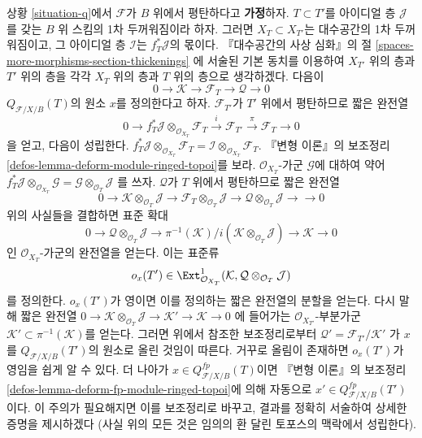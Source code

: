 \begin{remark}[몫의 장애]
\label{remark-q-obs}
상황 \ref{situation-q}에서 $\mathcal{F}$가 $B$ 위에서 평탄하다고
{\bf 가정}하자. $T \subset T'$를 아이디얼 층 $\mathcal{J}$를 갖는
$B$ 위 스킴의 1차 두꺼워짐이라 하자.
그러면 $X_T \subset X_{T'}$는 대수공간의 1차 두꺼워짐이고,
그 아이디얼 층 $\mathcal{I}$는 $f_T^*\mathcal{J}$의 몫이다.
『대수공간의 사상 심화』의 절
\ref{spaces-more-morphisms-section-thickenings}
에 서술된 기본 동치를 이용하여 $X_{T'}$ 위의 층과 $T'$ 위의 층을
각각 $X_T$ 위의 층과 $T$ 위의 층으로 생각하겠다. 다음이
$$
0 \to \mathcal{K} \to \mathcal{F}_T \to \mathcal{Q} \to 0
$$
$Q_{\mathcal{F}/X/B}(T)$의 원소 $x$를 정의한다고 하자.
$\mathcal{F}_{T'}$가 $T'$ 위에서 평탄하므로 짧은 완전열
$$
0 \to f_T^*\mathcal{J} \otimes_{\mathcal{O}_{X_T}} \mathcal{F}_T
\xrightarrow{i} \mathcal{F}_{T'} \xrightarrow{\pi} \mathcal{F}_T \to 0
$$
을 얻고, 다음이 성립한다.
$f_T^*\mathcal{J} \otimes_{\mathcal{O}_{X_T}} \mathcal{F}_T =
\mathcal{I} \otimes_{\mathcal{O}_{X_T}} \mathcal{F}_T$.
『변형 이론』의 보조정리 \ref{defos-lemma-deform-module-ringed-topoi}를 보라.
$\mathcal{O}_{X_T}$-가군 $\mathcal{G}$에 대하여 약어
$
f_T^*\mathcal{J} \otimes_{\mathcal{O}_{X_T}} \mathcal{G} =
\mathcal{G} \otimes_{\mathcal{O}_T} \mathcal{J}
$
를 쓰자. $\mathcal{Q}$가 $T$ 위에서 평탄하므로 짧은 완전열
$$
0 \to
\mathcal{K} \otimes_{\mathcal{O}_T} \mathcal{J} \to
\mathcal{F}_T \otimes_{\mathcal{O}_T} \mathcal{J} \to
\mathcal{Q} \otimes_{\mathcal{O}_T} \mathcal{J} \to
\to 0
$$
위의 사실들을 결합하면 표준 확대
$$
0 \to \mathcal{Q} \otimes_{\mathcal{O}_T} \mathcal{J} \to
\pi^{-1}(\mathcal{K})/i(\mathcal{K} \otimes_{\mathcal{O}_T} \mathcal{J}) \to
\mathcal{K} \to 0
$$
인 $\mathcal{O}_{X_T}$-가군의 완전열을 얻는다. 이는 표준류
$$
o_x(T') \in
\Ext^1_{\mathcal{O}_{X_T}}(\mathcal{K},
\mathcal{Q} \otimes_{\mathcal{O}_T} \mathcal{J})
$$
를 정의한다.
$o_x(T')$가 영이면 이를 정의하는 짧은 완전열의 분할을 얻는다.
다시 말해 짧은 완전열
$0 \to \mathcal{K} \otimes_{\mathcal{O}_T} \mathcal{J} \to
\mathcal{K}' \to \mathcal{K} \to 0$
에 들어가는 $\mathcal{O}_{X_{T'}}$-부분가군
$\mathcal{K}' \subset \pi^{-1}(\mathcal{K})$를 얻는다.
그러면 위에서 참조한 보조정리로부터
$\mathcal{Q}' = \mathcal{F}_{T'}/\mathcal{K}'$
가 $x$를 $Q_{\mathcal{F}/X/B}(T')$의 원소로 올린 것임이 따른다.
거꾸로 올림이 존재하면 $o_x(T')$가 영임을 쉽게 알 수 있다.
더 나아가 $x \in Q_{\mathcal{F}/X/B}^{fp}(T)$이면 『변형 이론』의 보조정리
\ref{defos-lemma-deform-fp-module-ringed-topoi}에 의해 자동으로
$x' \in Q_{\mathcal{F}/X/B}^{fp}(T')$이다. 이 주의가 필요해지면 이를
보조정리로 바꾸고, 결과를 정확히 서술하여 상세한 증명을 제시하겠다
(사실 위의 모든 것은 임의의 환 달린 토포스의 맥락에서 성립한다).
\end{remark}

